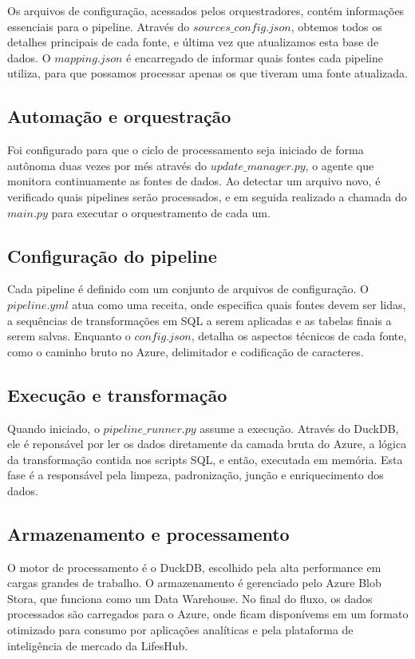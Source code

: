 Os arquivos de configuração, acessados pelos orquestradores, contém informações essenciais para o pipeline. Através do $sources\_config.json$, obtemos todos os detalhes principais de cada fonte, e última vez que atualizamos esta base de dados. O $mapping.json$ é encarregado de informar quais fontes cada pipeline utiliza, para que possamos processar apenas os que tiveram uma fonte atualizada.

\subsection{Automação e orquestração}

Foi configurado para que o ciclo de processamento seja iniciado de forma autônoma duas vezes por més através do $update\_manager.py$, o agente que monitora continuamente as fontes de dados. Ao detectar um arquivo novo, é verificado quais pipelines serão processados, e em seguida realizado a chamada do $main.py$ para executar o orquestramento de cada um.

\subsection{Configuração do pipeline}

Cada pipeline é definido com um conjunto de arquivos de configuração. O $pipeline.yml$ atua como uma receita, onde especifica quais fontes devem ser lidas, a sequências de transformações em SQL a serem aplicadas e as tabelas finais a serem salvas.
Enquanto o  $config.json$, detalha os aspectos técnicos de cada fonte, como o caminho bruto no Azure, delimitador e codificação de caracteres.

\subsection{Execução e transformação}

Quando iniciado, o $pipeline\_runner.py$ assume a execução. Através do DuckDB, ele é reponsável por ler os dados diretamente da camada bruta do Azure, a lógica da transformação contida nos scripts SQL, e então, executada em memória. Esta fase é a responsável pela limpeza, padronização, junção e enriquecimento dos dados.

\subsection{Armazenamento e processamento}

O motor de processamento é o DuckDB, escolhido pela alta performance em cargas grandes de trabalho. O armazenamento é gerenciado pelo Azure Blob Stora, que funciona como um Data Warehouse. No final do fluxo, os dados processados são carregados para o Azure, onde ficam disponívems em um formato otimizado para consumo por aplicações analíticas e pela plataforma de inteligência de mercado da LifesHub.